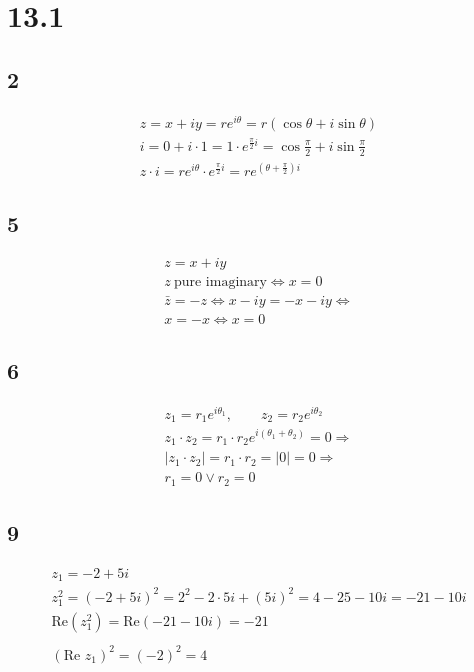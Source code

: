 \section*{13.1}

\subsection*{2}


\begin{gather*}
	z = x + i y = r e^{i \theta} = r \left(
		\cos{\theta} + i \sin{\theta}
	\right)
	\\
	i = 0 + i \cdot 1 = 1 \cdot e^{\frac{\pi}{2} i} =
	\cos{\frac{\pi}{2}} + i \sin{\frac{\pi}{2}}
	\\
	z \cdot i = r e^{i \theta} \cdot e^{\frac{\pi}{2} i} =
	r e^{\left(\theta + \frac{\pi}{2}\right) i}
\end{gather*}


\subsection*{5}


\begin{gather*}
	z = x + i y
	\\
	z\ \text{pure imaginary} \Leftrightarrow x = 0
	\\
	\bar z = -z \Leftrightarrow
	x - i y = -x - i y \Leftrightarrow
	\\
	x = -x \Leftrightarrow x = 0
\end{gather*}


\subsection*{6}


\begin{gather*}
	z_1 = r_1 e^{i \theta_1}, 
	\qquad
	z_2 = r_2 e^{i \theta_2}
	\\
	z_1 \cdot z_2 = r_1 \cdot r_2 e^{i \left(\theta_1 + \theta_2\right)} = 0 \Rightarrow
	\\
	|z_1 \cdot z_2| = r_1 \cdot r_2 = |0| = 0 \Rightarrow
	\\
	r_1 = 0 \vee r_2 = 0
\end{gather*}


\subsection*{9}


\begin{gather*}
	z_1 = -2 + 5 i
	\\
	z_1^2 = (-2 + 5 i)^2
	=
	2^2 - 2 \cdot 5 i + (5 i)^2
	=
	4 - 25 - 10 i = -21 - 10 i
	\\
	\text{Re} \left(z_1^2\right) = \text{Re} (-21 - 10 i) = -21
	\\
	\\
	(\text{Re } z_1)^2 = (-2)^2 = 4
\end{gather*}



